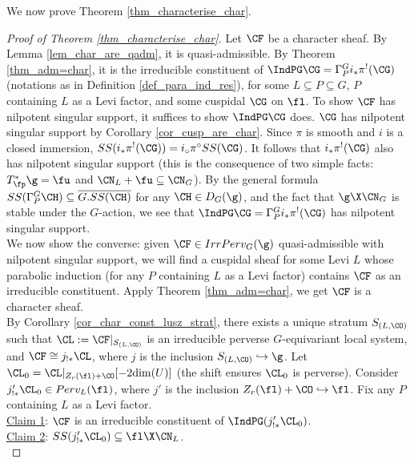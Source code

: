 We now prove Theorem \ref{thm_characterise_char}.

\begin{proof}[Proof of Theorem \ref{thm_characterise_char}]
Let $\CF$ be a character sheaf. By Lemma \ref{lem_char_are_qadm}, it is quasi-admissible. By Theorem \ref{thm_adm=char}, it is the irreducible constituent of $\IndPG\CG=\Gamma^G_P i_*\pi^!(\CG)$ (notations as in Definition \ref{def_para_ind_res}), for some $L\subseteq P\subseteq G$, $P$ containing $L$ as a Levi factor, and some cuspidal $\CG$ on $\fl$. To show $\CF$ has nilpotent singular support, it suffices to show $\IndPG\CG$ does. $\CG$ has nilpotent singular support by Corollary \ref{cor_cusp_are_char}. Since $\pi$ is smooth and $i$ is a closed immersion, $SS(i_*\pi^!(\CG))=i_\circ\pi^\circ SS(\CG)$. It follows that $i_*\pi^!(\CG)$ also has nilpotent singular support (this is the consequence of two simple facts: $T^*_\fp\g=\fu$ and $\CN_L+\fu\subseteq \CN_G$). By the general formula $SS(\Gamma^G_P\CH)\subseteq \overline{G.SS(\CH)}$ for any $\CH\in D_G(\g)$, and the fact that $\g\X\CN_G$ is stable under the $G$-action, we see that $\IndPG\CG=\Gamma^G_P i_*\pi^!(\CG)$ has nilpotent singular support.\\

We now show the converse: given $\CF\in IrrPerv_G(\g)$ quasi-admissible with nilpotent singular support, we will find a cuspidal sheaf for some Levi $L$ whose parabolic induction (for any $P$ containing $L$ as a Levi factor) contains $\CF$ as an irreducible constituent. Apply Theorem \ref{thm_adm=char}, we get $\CF$ is a character sheaf.\\

By Corollary \ref{cor_char_const_lusz_strat}, there exists a unique stratum $S_{(L,\CO)}$ such that $\CL:=\CF|_{S_{(L,\CO)}}$ is an irreducible perverse $G$-equivariant local system, and $\CF\cong j_{!*}\CL$, where $j$ is the inclusion $S_{(L,\CO)} \hookrightarrow \g$. Let $\CL_0=\CL|_{Z_r(\fl)+\CO}[-2\mathrm{dim}(U)]$ (the shift ensures $\CL_0$ is perverse). Consider $j'_{!*}\CL_0\in Perv_L(\fl)$, where $j'$ is the inclusion $Z_r(\fl)+\CO \hookrightarrow \fl$. Fix any $P$ containing $L$ as a Levi factor.\\

\underline{Claim 1}: $\CF$ is an irreducible constituent of $\IndPG(j'_{!*}\CL_0)$.\\

\underline{Claim 2}: $SS(j'_{!*}\CL_0)\subseteq \fl\X\CN_L$.\\


\end{proof}
